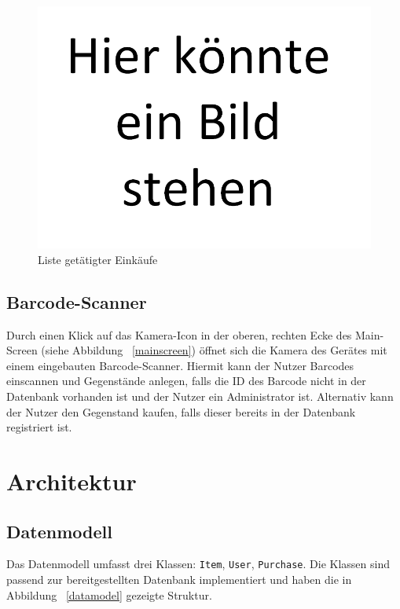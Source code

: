\documentclass{scrartcl}
\begin{document}
	\begin{figure}[!h]
		\centering
		\includegraphics[scale=0.5]{./figures/placeholder.png}
		\caption{Liste getätigter Einkäufe}
		\label{purchases}
	\end{figure}

	\subsection{Barcode-Scanner}\label{subsec:barcode-scanner}

	Durch einen Klick auf das Kamera-Icon in der oberen, rechten Ecke des Main-Screen (siehe Abbildung ~\ref{mainscreen}) öffnet sich die Kamera des Gerätes mit einem eingebauten Barcode-Scanner.
	Hiermit kann der Nutzer Barcodes einscannen und Gegenstände anlegen, falls die ID des Barcode nicht in der Datenbank vorhanden ist und der Nutzer ein Administrator ist.
	Alternativ kann der Nutzer den Gegenstand kaufen, falls dieser bereits in der Datenbank registriert ist.

	\section{Architektur}\label{sec:architecture}

	\subsection{Datenmodell}\label{subsec:datamodel}

	Das Datenmodell umfasst drei Klassen: \texttt{Item}, \texttt{User}, \texttt{Purchase}.
	Die Klassen sind passend zur bereitgestellten Datenbank implementiert und haben die in Abbildung ~\ref{datamodel} gezeigte Struktur.
\end{document}
